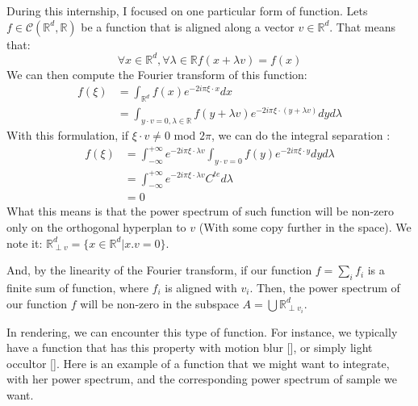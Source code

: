 \documentclass{classeENS}
\begin{document}
\> During this internship, I focused on one particular form of function.
    Lets $f\in\mathcal C(\mathbb R^d,\mathbb R)$ be a function that 
    is aligned along a vector $v \in \mathbb R^d$. That means that:
    \[ \forall x\in\mathbb R^d, \forall \lambda\in\mathbb R f(x+\lambda v) = f(x) \]
    We can then compute the Fourier transform of this function:
    \begin{align*}
        f(\xi) &= \int_{\mathbb R^d} f(x) e^{-2i\pi \xi\cdot x} dx \\
               &= \int_{y\cdot v=0, \lambda \in \mathbb R } f(y+\lambda v) 
                                    e^{-2i\pi \xi\cdot (y+\lambda v)} dy d\lambda
    \end{align*}
    With this formulation, if $\xi \cdot v \neq 0$ mod $2\pi$, we can do the integral separation : \begin{align*}
        f(\xi) &= \int_{-\infty}^{+\infty} e^{-2i\pi 
            \xi\cdot\lambda v} \int_{y\cdot v=0} f(y) e^{-2i\pi \xi\cdot y}  dy d\lambda \\
            &= \int_{-\infty}^{+\infty} e^{-2i\pi 
            \xi\cdot\lambda v} C^{te} d\lambda \\
            &= 0
    \end{align*}
    What this means is that the power spectrum of such function will be non-zero only on
    the orthogonal hyperplan to $v$ (With some copy further in the space). We note it: 
    $\mathbb R^d_{\perp v} = \{x \in \mathbb R^d | x.v = 0\}$.

\> And, by the linearity of the Fourier transform, if our function $f = \sum_i f_i$ is a finite sum 
    of function, where $f_i$ is aligned with $v_i$. Then, the power spectrum 
    of our function $f$ will be non-zero in the subspace 
    $A = \bigcup \mathbb R^d_{\perp v_i}$.

\> In rendering, we can encounter this type of function. For instance, 
    we typically have a function that has this property with motion blur [\cite{singh17convergence}], 
    or simply light occultor [\cite{journals/tog/EganHDR11}].
    Here is an example of a function that we might want to integrate, with her power
    spectrum, and the corresponding power spectrum of sample we want.
\end{document}
